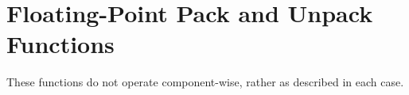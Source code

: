 \hypertarget{group__core__func__packing}{\section{\-Floating-\/\-Point \-Pack and \-Unpack \-Functions}
\label{group__core__func__packing}
}
\-These functions do not operate component-\/wise, rather as described in each case. 